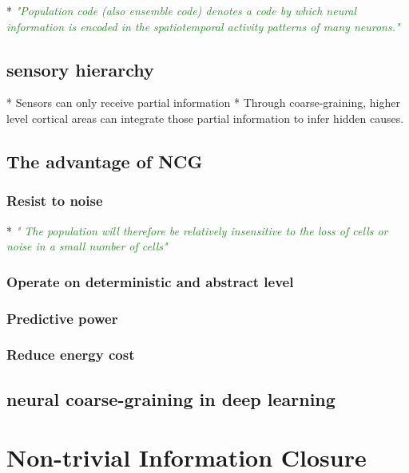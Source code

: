 \documentclass[utf8]{article}
\newcommand{\rewrite}[1]{\textcolor{ForestGreen}{\textit{"#1"}}}
\begin{document}
			* \rewrite{Population code (also ensemble code) denotes a code by which neural information is encoded in the spatiotemporal activity patterns of many neurons.} \cite{binder2009encyclopedia}
			
			
		
		
		\subsection{sensory hierarchy}
			* Sensors can only receive partial information
			* Through coarse-graining, higher level cortical areas can integrate those partial information to infer hidden causes. 
		
		
		
		\subsection{The advantage of NCG}
			\subsubsection{Resist to noise}
				* \rewrite{ The population will therefore be relatively insensitive to the loss of
					cells or noise in a small number of cells} \cite{eurich2000multidimensional}
		
		
			\subsubsection{Operate on deterministic and abstract level}
			\subsubsection{Predictive power}
			\subsubsection{Reduce energy cost}	
			
		\subsection{neural coarse-graining in deep learning}
			
			
	\section{Non-trivial Information Closure}
	
\end{document}
